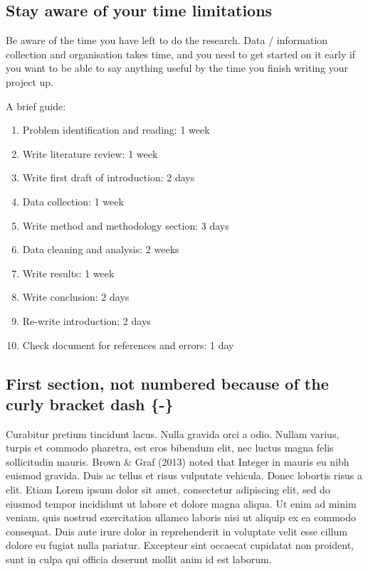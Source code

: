 \documentclass[10pt,twoside]{article}
\begin{document}
\hypertarget{stay-aware-of-your-time-limitations}{%
\subsection{Stay aware of your time
limitations}\label{stay-aware-of-your-time-limitations}}

Be aware of the time you have left to do the research. Data /
information collection and organisation takes time, and you need to get
started on it early if you want to be able to say anything useful by the
time you finish writing your project up.

A brief guide:

\begin{enumerate}
\def\labelenumi{\arabic{enumi}.}
\item
  Problem identification and reading: 1 week
\item
  Write literature review: 1 week
\item
  Write first draft of introduction: 2 days
\item
  Data collection: 1 week
\item
  Write method and methodology section: 3 days
\item
  Data cleaning and analysis: 2 weeks
\item
  Write results: 1 week
\item
  Write conclusion: 2 days
\item
  Re-write introduction: 2 days
\item
  Check document for references and errors: 1 day
\end{enumerate}

\FloatBarrier
\newpage


\hypertarget{first-section-not-numbered-because-of-the-curly-bracket-dash--}{%
\subsection*{First section, not numbered because of the curly bracket
dash
\{-\}}\label{first-section-not-numbered-because-of-the-curly-bracket-dash--}}

Curabitur pretium tincidunt lacus. Nulla gravida orci a odio. Nullam
varius, turpis et commodo pharetra, est eros bibendum elit, nec luctus
magna felis sollicitudin mauris. Brown \& Graf (2013) noted that Integer
in mauris eu nibh euismod gravida. Duis ac tellus et risus vulputate
vehicula. Donec lobortis risus a elit. Etiam Lorem ipsum dolor sit amet,
consectetur adipiscing elit, sed do eiusmod tempor incididunt ut labore
et dolore magna aliqua. Ut enim ad minim veniam, quis nostrud
exercitation ullamco laboris nisi ut aliquip ex ea commodo consequat.
Duis aute irure dolor in reprehenderit in voluptate velit esse cillum
dolore eu fugiat nulla pariatur. Excepteur sint occaecat cupidatat non
proident, sunt in culpa qui officia deserunt mollit anim id est laborum.
\end{document}
